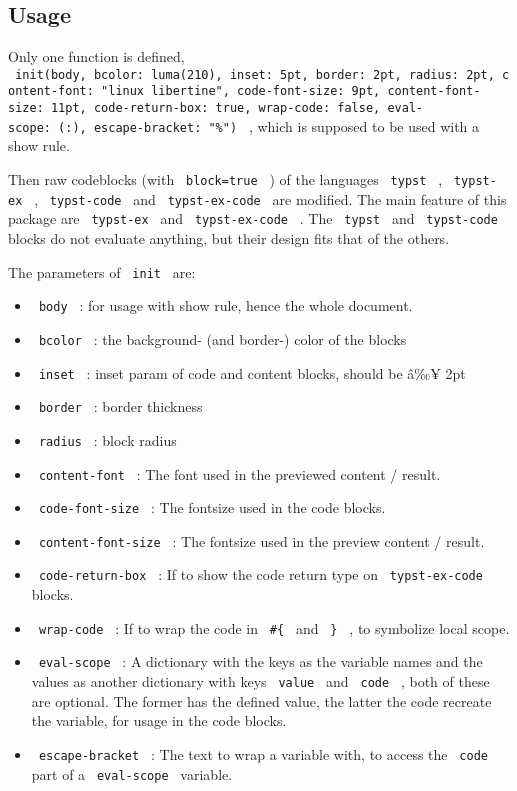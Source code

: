 \subsection{Usage}\label{usage}

Only one function is defined,
\texttt{\ init(body,\ bcolor:\ luma(210),\ inset:\ 5pt,\ border:\ 2pt,\ radius:\ 2pt,\ content-font:\ "linux\ libertine",\ code-font-size:\ 9pt,\ content-font-size:\ 11pt,\ code-return-box:\ true,\ wrap-code:\ false,\ eval-scope:\ (:),\ escape-bracket:\ "\%")\ }
, which is supposed to be used with a show rule.

Then raw codeblocks (with \texttt{\ block=true\ } ) of the languages
\texttt{\ typst\ } , \texttt{\ typst-ex\ } , \texttt{\ typst-code\ } and
\texttt{\ typst-ex-code\ } are modified. The main feature of this
package are \texttt{\ typst-ex\ } and \texttt{\ typst-ex-code\ } . The
\texttt{\ typst\ } and \texttt{\ typst-code\ } blocks do not evaluate
anything, but their design fits that of the others.

The parameters of \texttt{\ init\ } are:

\begin{itemize}
\tightlist
\item
  \texttt{\ body\ } : for usage with show rule, hence the whole
  document.
\item
  \texttt{\ bcolor\ } : the background- (and border-) color of the
  blocks
\item
  \texttt{\ inset\ } : inset param of code and content blocks, should be
  â‰¥ 2pt
\item
  \texttt{\ border\ } : border thickness
\item
  \texttt{\ radius\ } : block radius
\item
  \texttt{\ content-font\ } : The font used in the previewed content /
  result.
\item
  \texttt{\ code-font-size\ } : The fontsize used in the code blocks.
\item
  \texttt{\ content-font-size\ } : The fontsize used in the preview
  content / result.
\item
  \texttt{\ code-return-box\ } : If to show the code return type on
  \texttt{\ typst-ex-code\ } blocks.
\item
  \texttt{\ wrap-code\ } : If to wrap the code in \texttt{\ \#\{\ } and
  \texttt{\ \}\ } , to symbolize local scope.
\item
  \texttt{\ eval-scope\ } : A dictionary with the keys as the variable
  names and the values as another dictionary with keys
  \texttt{\ value\ } and \texttt{\ code\ } , both of these are optional.
  The former has the defined value, the latter the code recreate the
  variable, for usage in the code blocks.
\item
  \texttt{\ escape-bracket\ } : The text to wrap a variable with, to
  access the \texttt{\ code\ } part of a \texttt{\ eval-scope\ }
  variable.
\end{itemize}

